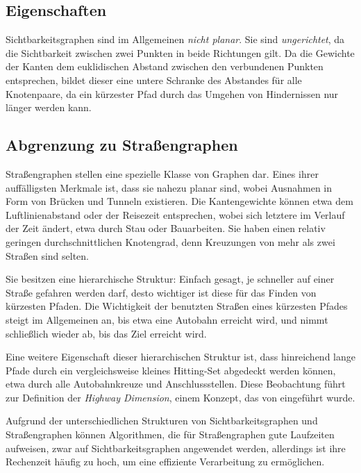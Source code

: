 \subsection{Eigenschaften}

Sichtbarkeitsgraphen sind im Allgemeinen \emph{nicht planar}.
Sie sind \emph{ungerichtet}, da die Sichtbarkeit zwischen zwei Punkten in beide Richtungen gilt.
Da die Gewichte der Kanten dem euklidischen Abstand zwischen den verbundenen Punkten entsprechen, bildet dieser eine untere Schranke des Abstandes für alle Knotenpaare, da ein kürzester Pfad durch das Umgehen von Hindernissen nur länger werden kann.

\subsection{Abgrenzung zu Straßengraphen}\label{graphs:strassengraphen}

Straßengraphen stellen eine spezielle Klasse von Graphen dar.
Eines ihrer auffälligsten Merkmale ist, dass sie nahezu planar sind, wobei Ausnahmen in Form von Brücken und Tunneln existieren.
Die Kantengewichte können etwa dem Luftlinienabstand oder der Reisezeit entsprechen, wobei sich letztere im Verlauf der Zeit ändert, etwa durch Stau oder Bauarbeiten.
Sie haben einen relativ geringen durchschnittlichen Knotengrad, denn Kreuzungen von mehr als zwei Straßen sind selten.

Sie besitzen eine hierarchische Struktur: Einfach gesagt, je schneller auf einer Straße gefahren werden darf, desto wichtiger ist diese für das Finden von kürzesten Pfaden.
Die Wichtigkeit der benutzten Straßen eines kürzesten Pfades steigt im Allgemeinen an, bis etwa eine Autobahn erreicht wird, und nimmt schließlich wieder ab, bis das Ziel erreicht wird.

Eine weitere Eigenschaft dieser hierarchischen Struktur ist, dass hinreichend lange Pfade durch ein vergleichsweise kleines Hitting-Set abgedeckt werden können, etwa durch alle Autobahnkreuze und Anschlussstellen.
Diese Beobachtung führt zur Definition der \emph{Highway Dimension}, einem Konzept, das von \cite{abraham2010highway} eingeführt wurde.

Aufgrund der unterschiedlichen Strukturen von Sichtbarkeitsgraphen und Straßengraphen können Algorithmen, die für Straßengraphen gute Laufzeiten aufweisen, zwar auf Sichtbarkeitsgraphen angewendet werden, allerdings ist ihre Rechenzeit häufig zu hoch, um eine effiziente Verarbeitung zu ermöglichen.

